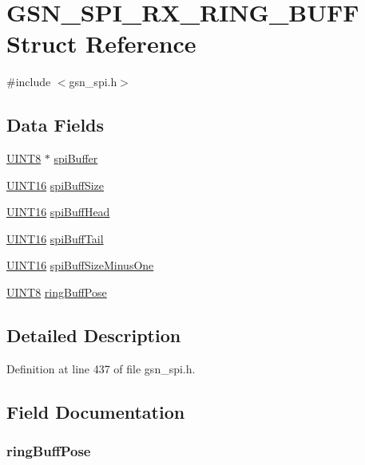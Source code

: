 \hypertarget{a00240}{
\section{GSN\_\-SPI\_\-RX\_\-RING\_\-BUFF Struct Reference}
\label{a00240}
}


{\ttfamily \#include $<$gsn\_\-spi.h$>$}

\subsection*{Data Fields}
\begin{DoxyCompactItemize}
\item 
\hyperlink{a00660_gab27e9918b538ce9d8ca692479b375b6a}{UINT8} $\ast$ \hyperlink{a00240_a03498c76fbc1ee700292158aac3f6cfc}{spiBuffer}
\item 
\hyperlink{a00660_ga09f1a1fb2293e33483cc8d44aefb1eb1}{UINT16} \hyperlink{a00240_a7015ecf2e079b914011daba0d4146670}{spiBuffSize}
\item 
\hyperlink{a00660_ga09f1a1fb2293e33483cc8d44aefb1eb1}{UINT16} \hyperlink{a00240_a18fdf23d4c7a25c4f8822c7183fe746f}{spiBuffHead}
\item 
\hyperlink{a00660_ga09f1a1fb2293e33483cc8d44aefb1eb1}{UINT16} \hyperlink{a00240_a0f15b8dada019c7bc412bb5577e7e1a9}{spiBuffTail}
\item 
\hyperlink{a00660_ga09f1a1fb2293e33483cc8d44aefb1eb1}{UINT16} \hyperlink{a00240_ac0819f802dab9ed6eeb2618636615369}{spiBuffSizeMinusOne}
\item 
\hyperlink{a00660_gab27e9918b538ce9d8ca692479b375b6a}{UINT8} \hyperlink{a00240_a18788ee595f89a60c5e0d6ce24f439ef}{ringBuffPose}
\end{DoxyCompactItemize}


\subsection{Detailed Description}


Definition at line 437 of file gsn\_\-spi.h.



\subsection{Field Documentation}
\hypertarget{a00240_a18788ee595f89a60c5e0d6ce24f439ef}{
\subsubsection[{ringBuffPose}]{ {\bf ringBuffPose}}}
\label{a00240_a18788ee595f89a60c5e0d6ce24f439ef}


